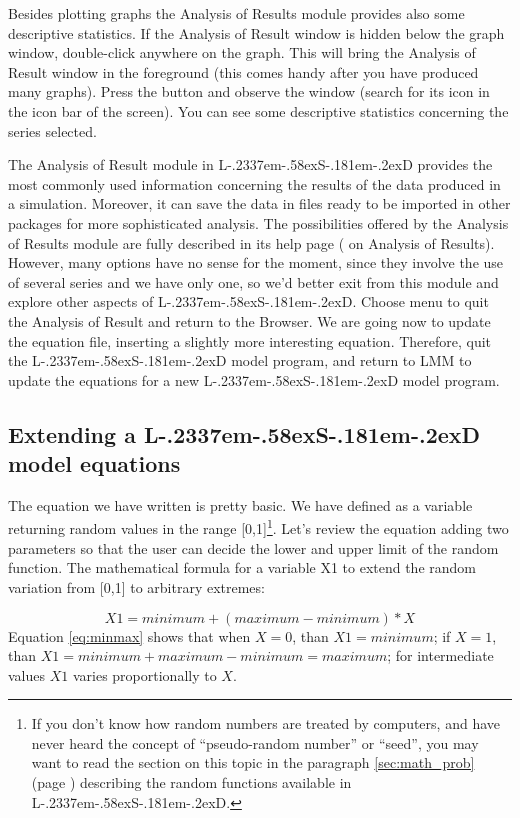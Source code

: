 \documentclass [11pt,a4paper] {book}
\def\LsD{{L\kern-.2337em\lower-.58ex\hbox{S}\kern-.181em\lower-.2ex\hbox{D}}\xspace}
\begin{document}
Besides plotting graphs the Analysis of Results module provides also some descriptive
statistics. If the Analysis of Result window is hidden below the graph window,
double-click anywhere on the graph. This will bring the Analysis of Result window in the
foreground (this comes handy after you have produced many graphs). Press the
button  and observe the  window (search for its icon in the icon bar of the screen). You can see some descriptive statistics concerning the series selected.

The Analysis of Result module in \LsD provides the most commonly used information
concerning the results of the data produced in a simulation. Moreover, it can save the
data in files ready to be imported in other packages for more sophisticated analysis. The
possibilities offered by the Analysis of Results module are fully described in its help
page ( on Analysis of Results). However, many options have no sense for
the moment, since they involve the use of several series and we have only one, so we'd
better exit from this module and explore other aspects of \LsD. Choose menu
 to quit the Analysis of Result and return to the Browser. We are going
now to update the equation file, inserting a slightly more interesting equation.
Therefore, quit the \LsD model program, and return to LMM to update the equations for a new \LsD model program.

\subsection{Extending a \LsD model equations}

The equation we have written is pretty basic. We have defined  as a variable
returning random values in the range [0,1]\footnote{If you don't know how random numbers
are treated by computers, and have never heard the concept of ``pseudo-random number'' or
``seed'', you may want to read the section on this topic in the paragraph
\ref{sec:math_prob} (page \pageref{sec:math_prob}) describing the random functions
available in \LsD.}. Let's review the equation adding two parameters so that the user can
decide the lower and upper limit of the random function. The mathematical formula for a
variable X1 to extend the random variation from [0,1] to arbitrary extremes:

\begin{equation}
 X1 = minimum + (maximum - minimum) * X \label{eq:minmax}
\end{equation}
Equation \ref{eq:minmax} shows that when $X=0$, than $X1=minimum$; if
$X=1$, than $X1=minimum+maximum-minimum=maximum$; for intermediate
values $X1$ varies proportionally to $X$.
\end{document}
